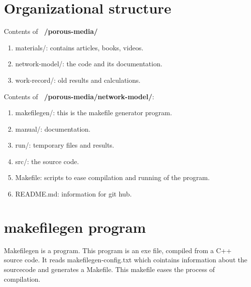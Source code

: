 \section{Organizational structure}
	Contents of \textbf{~/porous-media/}
	\begin{enumerate}
		\item materials/: contains articles, books, videos.
		\item network-model/: the code and its documentation.
		\item work-record/: old results and calculations.
	\end{enumerate}

	Contents of \textbf{~/porous-media/network-model/}:
	\begin{enumerate}
		\item makefilegen/: this is the makefile generator program.
		\item manual/: documentation.
		\item run/: temporary files and results.
		\item src/: the source code.
		\item Makefile: scripts to ease compilation and running of the program.
		\item README.md: information for git hub.
	\end{enumerate}


\section{makefilegen program}
	Makefilegen is a program. This program is an exe file, compiled from a C++ source code. It reads makefilegen-config.txt which cointains information about the sourcecode and generates a Makefile. This makefile eases the process of compilation.

